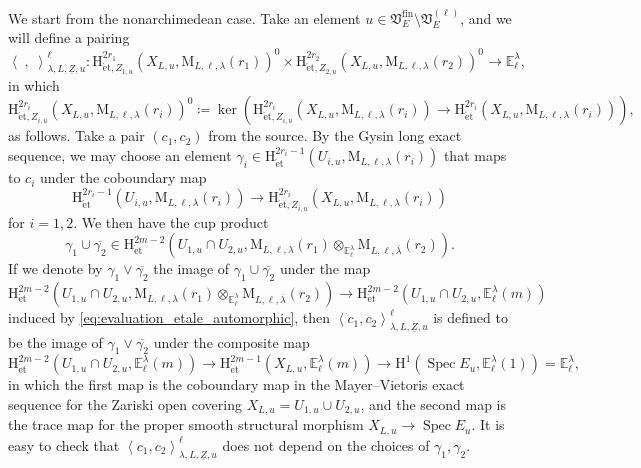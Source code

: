 \documentclass[12pt]{amsart}
\numberwithin{equation}{section}
\theoremstyle{plain}
\theoremstyle{definition}
\theoremstyle{remark}
\renewcommand{\d}[1]{\mathbb{#1}}
\newcommand{\f}[1]{\mathfrak{#1}}
\renewcommand{\r}[1]{\mathrm{#1}}
\renewcommand{\(}{\left(}
\renewcommand{\)}{\right)}
\newcommand{\ol}[1]{\overline{#1}{}}
\newcommand{\ul}{\underline}
\newcommand{\dE}{\d E}
\newcommand{\fV}{\f V}
\newcommand{\rH}{\r H}
\newcommand{\rM}{\r M}
\newcommand{\llangle}{\left\langle}
\newcommand{\rrangle}{\right\rangle}
\newcommand{\et}{{\acute{\r{e}}\r{t}}}
\newcommand{\fin}{\r{fin}}
\DeclareMathOperator{\Ker}{ker}
\DeclareMathOperator{\Spec}{Spec}
\begin{document}
We start from the nonarchimedean case. Take an element $u\in\fV_E^\fin\setminus\fV_E^{(\ell)}$, and we will define a pairing
\[
\llangle\;,\;\rrangle_{\lambda,L,\ul{Z},u}^{\ell}\colon
\rH^{2r_1}_{\et,Z_{1,u}}(X_{L,u},\rM_{L,\ell,\lambda}(r_1))^0
\times\rH^{2r_2}_{\et,Z_{2,u}}(X_{L,u},\rM_{L,\ell,\lambda}(r_2))^0
\to\dE^\lambda_\ell,
\]
in which
\[
\rH^{2r_i}_{\et,Z_{i,u}}(X_{L,u},\rM_{L,\ell,\lambda}(r_i))^0\coloneqq
\Ker\(\rH^{2r_i}_{\et,Z_{i,u}}(X_{L,u},\rM_{L,\ell,\lambda}(r_i))\to
\rH^{2r_i}_{\et}(X_{L,u},\rM_{L,\ell,\lambda}(r_i))\),
\]
as follows. Take a pair $(c_1,c_2)$ from the source. By the Gysin long exact sequence, we may choose an element $\gamma_i\in\rH^{2r_i-1}_{\et}(U_{i,u},\rM_{L,\ell,\lambda}(r_i))$ that maps to $c_i$ under the coboundary map
\[
\rH^{2r_i-1}_{\et}(U_{i,u},\rM_{L,\ell,\lambda}(r_i))\to\rH^{2r_i}_{\et,Z_{i,u}}(X_{L,u},\rM_{L,\ell,\lambda}(r_i))
\]
for $i=1,2$. We then have the cup product
\[
\gamma_1\cup\ol{\gamma_2}\in\rH^{2m-2}_{\et}(U_{1,u}\cap U_{2,u},\rM_{L,\ell,\lambda}(r_1)\otimes_{\dE^\lambda_\ell}\rM_{L,\ell,\ol\lambda}(r_2)).
\]
If we denote by $\gamma_1\vee\ol{\gamma_2}$ the image of $\gamma_1\cup\ol{\gamma_2}$ under the map
\[
\rH^{2m-2}_{\et}(U_{1,u}\cap U_{2,u},\rM_{L,\ell,\lambda}(r_1)\otimes_{\dE^\lambda_\ell}\rM_{L,\ell,\ol\lambda}(r_2))
\to\rH^{2m-2}_{\et}(U_{1,u}\cap U_{2,u},\dE^\lambda_\ell(m))
\]
induced by \eqref{eq:evaluation_etale_automorphic}, then $\llangle c_1,c_2\rrangle_{\lambda,L,\ul{Z},u}^{\ell}$ is defined to be the image of $\gamma_1\vee\ol{\gamma_2}$ under the composite map
\[
\rH^{2m-2}_{\et}(U_{1,u}\cap U_{2,u},\dE^\lambda_\ell(m))\to\rH^{2m-1}_{\et}(X_{L,u},\dE^\lambda_\ell(m))\to
\rH^1(\Spec E_u,\dE^\lambda_\ell(1))=\dE^\lambda_\ell,
\]
in which the first map is the coboundary map in the Mayer--Vietoris exact sequence for the Zariski open covering $X_{L,u}=U_{1,u}\cup U_{2,u}$, and the second map is the trace map for the proper smooth structural morphism $X_{L,u}\to\Spec E_u$. It is easy to check that $\llangle c_1,c_2\rrangle_{\lambda,L,\ul{Z},u}^{\ell}$ does not depend on the choices of $\gamma_1,\gamma_2$.
\end{document}
